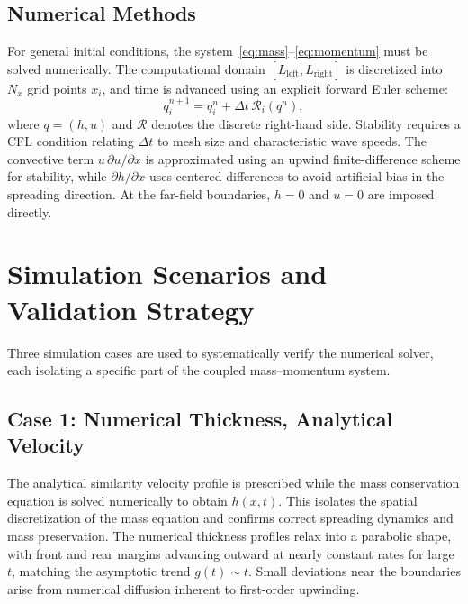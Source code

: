 \documentclass[10pt, conference]{FMFP2023}
\begin{document}
\subsection{Numerical Methods}

For general initial conditions, the system~\eqref{eq:mass}--\eqref{eq:momentum}
must be solved numerically.
The computational domain $[L_{\text{left}}, L_{\text{right}}]$ is
discretized into $N_x$ grid points $x_i$, and time is advanced using
an explicit forward Euler scheme:
\begin{equation}
    q_i^{n+1} = q_i^n + \Delta t\,\mathcal{R}_i(q^n),
\end{equation}
where $q=(h,u)$ and $\mathcal{R}$ denotes the discrete right-hand
side.
Stability requires a CFL condition relating $\Delta t$ to mesh size
and characteristic wave speeds.
The convective term $u\,\partial u/\partial x$ is approximated using
an upwind finite-difference scheme for stability, while
$\partial h/\partial x$ uses centered differences to avoid artificial
bias in the spreading direction.
At the far-field boundaries, $h=0$ and $u=0$ are imposed directly.

\section{Simulation Scenarios and Validation Strategy}

Three simulation cases are used to systematically verify the numerical
solver, each isolating a specific part of the coupled
mass--momentum system.

\subsection{Case 1: Numerical Thickness, Analytical Velocity}

The analytical similarity velocity profile is prescribed while the
mass conservation equation is solved numerically to obtain $h(x,t)$.
This isolates the spatial discretization of the mass equation and
confirms correct spreading dynamics and mass preservation.
The numerical thickness profiles relax into a parabolic shape,
with front and rear margins advancing outward at nearly constant rates
for large $t$, matching the asymptotic trend $g(t)\sim t$.
Small deviations near the boundaries arise from numerical diffusion
inherent to first-order upwinding.
\end{document}
